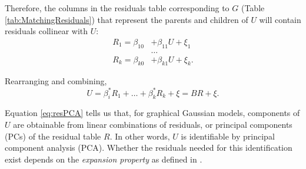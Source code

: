 \documentclass{article}
\begin{document}
\begin{center}
\begin{table}[ht]
\centering
{}
\qquad
\qquad
\qquad
\qquad
{}
\caption{The training data frame (Variables) implies a matching data frame (Residuals) once the joint distribution of all variables is specified via a graph and its parameterization}
\label{tab:MatchingResiduals}
\end{table}
\end{center}

Therefore, the columns in the residuals table corresponding to $G$ (Table \ref{tab:MatchingResiduals}) that represent the parents and children of $U$ will contain residuals collinear with $U$:
\begin{equation}
\begin{split}
R_1 = \beta_{10} &+ \beta_{11} U + \xi_1\\
& \hdots\\
R_k = \beta_{k0} &+ \beta_{k1} U + \xi_k.
\end{split}
\end{equation}

Rearranging and combining,
\begin{equation}
U = \beta_i^{*} R_1 + \dots + \beta_k^{*} R_k + \xi = B R + \xi.
\label{eq:resPCA}
\end{equation}

Equation \ref{eq:resPCA} tells us that, for graphical Gaussian models, components of $U$ are obtainable from linear combinations of residuals, or principal components (PCs) of the residual table $R$.  In other words, $U$ is identifiable by principal component analysis (PCA).  Whether the residuals needed for this identification exist depends on the \textit{expansion property} as defined in \cite{anandkumar_learning_2013}.
\end{document}
